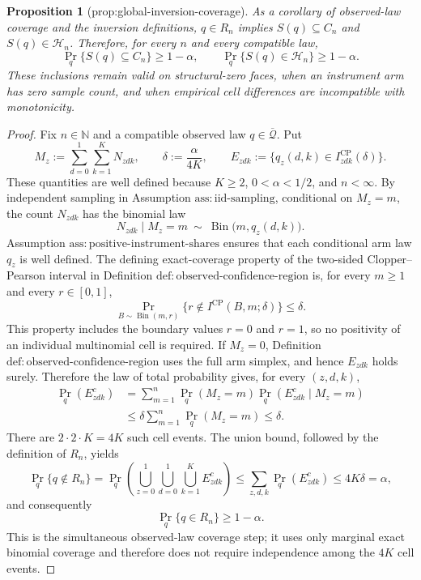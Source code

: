 \documentclass{article}
\newtheorem{proposition}{Proposition}
\begin{document}
\begin{proposition}[prop:global-inversion-coverage]\label{prop:global-inversion-coverage}
As a corollary of observed-law coverage and the inversion definitions, \(q\in R_n\) implies \(S(q)\subseteq C_n\) and \(S(q)\in\mathcal H_n\). Therefore, for every \(n\) and every compatible law, \[\Pr_q\{S(q)\subseteq C_n\}\ge1-\alpha,\qquad \Pr_q\{S(q)\in\mathcal H_n\}\ge1-\alpha.\] These inclusions remain valid on structural-zero faces, when an instrument arm has zero sample count, and when empirical cell differences are incompatible with monotonicity.
\end{proposition}
\begin{proof}
Fix \(n\in\mathbb N\) and a compatible observed law \(q\in\overline{\mathcal Q}\).  Put
\[
M_z:=\sum_{d=0}^1\sum_{k=1}^K N_{zdk},
\qquad
\delta:=\frac{\alpha}{4K},
\qquad
E_{zdk}:=\{q_z(d,k)\in I^{\mathrm{CP}}_{zdk}(\delta)\}.
\]
These quantities are well defined because \(K\ge2\), \(0<\alpha<1/2\), and \(n<\infty\).  By independent sampling in Assumption \(\mathrm{ass:iid\text{-}sampling}\), conditional on \(M_z=m\), the count \(N_{zdk}\) has the binomial law
\[
N_{zdk}\mid M_z=m\ \sim\ \operatorname{Bin}\bigl(m,q_z(d,k)\bigr).
\]
Assumption \(\mathrm{ass:positive\text{-}instrument\text{-}shares}\) ensures that each conditional arm law \(q_z\) is well defined.  The defining exact-coverage property of the two-sided Clopper--Pearson interval in Definition \(\mathrm{def:observed\text{-}confidence\text{-}region}\) is, for every \(m\ge1\) and every \(r\in[0,1]\),
\[
\Pr_{B\sim\operatorname{Bin}(m,r)}
 \{r\notin I^{\mathrm{CP}}(B,m;\delta)\}\le\delta.
\]
This property includes the boundary values \(r=0\) and \(r=1\), so no positivity of an individual multinomial cell is required.  If \(M_z=0\), Definition \(\mathrm{def:observed\text{-}confidence\text{-}region}\) uses the full arm simplex, and hence \(E_{zdk}\) holds surely.  Therefore the law of total probability gives, for every \((z,d,k)\),
\[
\begin{aligned}
\Pr_q(E_{zdk}^{c})
&=\sum_{m=1}^{n}\Pr_q(M_z=m)
  \Pr_q(E_{zdk}^{c}\mid M_z=m)\\
&\le \delta\sum_{m=1}^{n}\Pr_q(M_z=m)
\le\delta.
\end{aligned}
\]
There are \(2\cdot2\cdot K=4K\) such cell events.  The union bound, followed by the definition of \(R_n\), yields
\[
\Pr_q\{q\notin R_n\}
 =\Pr_q\!\left(\bigcup_{z=0}^1\bigcup_{d=0}^1
                    \bigcup_{k=1}^K E_{zdk}^{c}\right)
 \le\sum_{z,d,k}\Pr_q(E_{zdk}^{c})
 \le4K\delta=\alpha,
\]
and consequently
\[
\Pr_q\{q\in R_n\}\ge1-\alpha. \tag{1}
\]
This is the simultaneous observed-law coverage step; it uses only marginal exact binomial coverage and therefore does not require independence among the \(4K\) cell events.


\end{proof}
\end{document}
